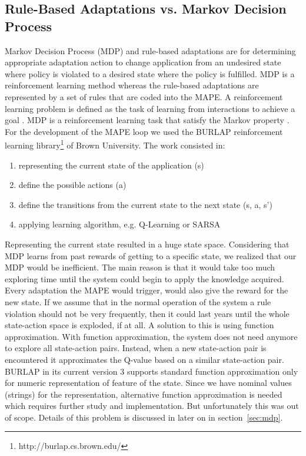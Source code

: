 \documentclass{seal_thesis}
\begin{document}
\subsection{Rule-Based Adaptations vs. Markov Decision Process}

Markov Decision Process (MDP) and rule-based adaptations are for determining appropriate adaptation action to change application from an undesired state where policy is violated to a desired state where the policy is fulfilled. MDP is a reinforcement learning method whereas the rule-based adaptations are represented by a set of rules that are coded into the MAPE.
A reinforcement learning problem is defined as the task of learning from interactions to achieve a goal \cite{sutton1998reinforcement}.
MDP is a reinforcement learning task that satisfy the Markov property \cite{sutton1998reinforcement}.
For the development of the MAPE loop we used the BURLAP reinforcement learning library\footnote{http://burlap.cs.brown.edu/} of Brown University. The work consisted in:
\begin{enumerate}
	\item representing the current state of the application (s)
	\item define the possible actions (a)
	\item define the transitions from the current state to the next state (s, a, s')
	\item applying learning algorithm, e.g. Q-Learning or SARSA
\end{enumerate}
Representing the current state resulted in a huge state space.
Considering that MDP learns from past rewards of getting to a specific state, we realized that our MDP would be inefficient.
The main reason is that it would take too much exploring time until the system could begin to apply the knowledge acquired.
Every adaptation the MAPE would trigger, would also give the reward for the new state.
If we assume that in the normal operation of the system a rule violation should not be very frequently, then it could last years until the whole state-action space is exploded, if at all.
A solution to this is using function approximation.
With function approximation, the system does not need anymore to explore all state-action pairs.
Instead, when a new state-action pair is encountered it approximates the Q-value based on a similar state-action pair.
BURLAP in its current version 3 supports standard function approximation only for numeric representation of feature of the state.
Since we have nominal values (strings) for the representation, alternative function approximation is needed which requires further study and implementation.
But unfortunately this was out of scope. 
Details of this problem is discussed in later on in section~\ref{sec:mdp}.
\end{document}
